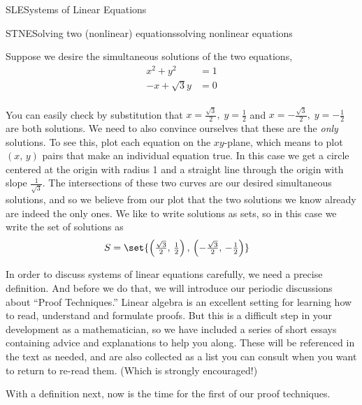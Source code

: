 \begin{subsect}{SLE}{Systems of Linear Equations}
%
\begin{example}{STNE}{Solving two (nonlinear) equations}{solving nonlinear equations}
\begin{para}Suppose we desire the simultaneous solutions of the two equations,
%
\begin{align*}
x^2+y^2&=1\\
-x+\sqrt{3}y&=0\\
\end{align*}
\end{para}
%
\begin{para}You can easily check by substitution that $x=\tfrac{\sqrt{3}}{2},\;y=\tfrac{1}{2}$ and $x=-\tfrac{\sqrt{3}}{2},\;y=-\tfrac{1}{2}$ are both solutions.  We need to also convince ourselves that these are the {\em only} solutions.  To see this, plot each equation on the $xy$-plane, which means to plot $(x,\,y)$ pairs that make an individual equation true.  In this case we get a circle centered at the origin with radius 1 and a straight line through the origin with slope $\tfrac{1}{\sqrt{3}}$.  The intersections of these two curves are our desired simultaneous solutions, and so we believe from our plot that the two solutions we know already are indeed the only ones.  We like to write solutions as sets, so in this case we write the set of solutions as
%
\begin{align*}
S&=\set{\left(\tfrac{\sqrt{3}}{2},\,\tfrac{1}{2}\right),\,\left(-\tfrac{\sqrt{3}}{2},\,-\tfrac{1}{2}\right)}
\end{align*}
\end{para}
%
\end{example}
%
\begin{para}In order to discuss systems of linear equations carefully, we need a precise definition.  And before we do that, we will introduce our periodic discussions about ``Proof Techniques.'' Linear algebra is an excellent setting for learning how to read, understand and formulate proofs.  But this is a difficult step in your development as a mathematician, so we have included a series of short essays containing advice and explanations to help you along.  These will be referenced in the text as needed, and are also collected as a list you can consult when you want to return to re-read them. (Which is strongly encouraged!)\end{para}
%
\begin{para}With a definition next, now is the time for the first of our proof techniques.

\end{para}
\end{subsect}
